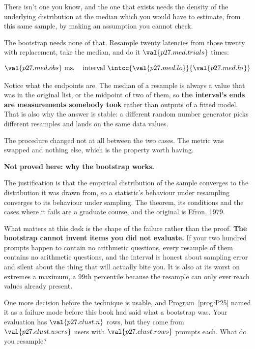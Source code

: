 \begin{fr}
\begin{ansblock}
There isn't one you know, and the one that exists needs the density of the
underlying distribution at the median \dash{} which you would have to
estimate, from this same sample, by making an assumption you cannot check.
\end{ansblock}

The bootstrap needs none of that. Resample twenty latencies from those twenty
with replacement, take the median, and do it
$\val{p27.med.trials}$ times:

\[ \val{p27.med.obs}\ \text{ms}, \quad
   \text{interval } \intcc{\val{p27.med.lo}}{\val{p27.med.hi}} \]

Notice what the endpoints are. The median of a resample is always a value
that was in the original list, or the midpoint of two of them, so
\textbf{the interval's ends are measurements somebody took} rather than
outputs of a fitted model. That is also why the answer is stable: a different
random number generator picks different resamples and lands on the same data
values.

The procedure changed not at all between the two cases. The metric was swapped
and nothing else, which is the property worth having.
\end{fr}

\begin{fr}
\begin{rigourbox}
\textbf{Not proved here: why the bootstrap works.}

The justification is that the empirical distribution of the sample converges
to the distribution it was drawn from, so a statistic's behaviour under
resampling converges to its behaviour under sampling. The theorem, its
conditions and the cases where it fails are a graduate course, and the
original is Efron, 1979.

What matters at this desk is the shape of the failure rather than the proof.
\textbf{The bootstrap cannot invent items you did not evaluate.} If your two
hundred prompts happen to contain no arithmetic questions, every resample of
them contains no arithmetic questions, and the interval is honest about
sampling error and silent about the thing that will actually bite you. It is
also at its worst on extremes \dash{} a maximum, a $99$th percentile
\dash{} because the resample can only ever reach values already present.
\end{rigourbox}

One more decision before the technique is usable, and Program~\ref{prog:P25}
named it as a failure mode before this book had said what a bootstrap was.
Your evaluation has $\val{p27.clust.n}$ rows, but they come from
$\val{p27.clust.users}$ users with $\val{p27.clust.rows}$ prompts each. What
do you resample?
\dotline
\nextframe
\end{fr}

